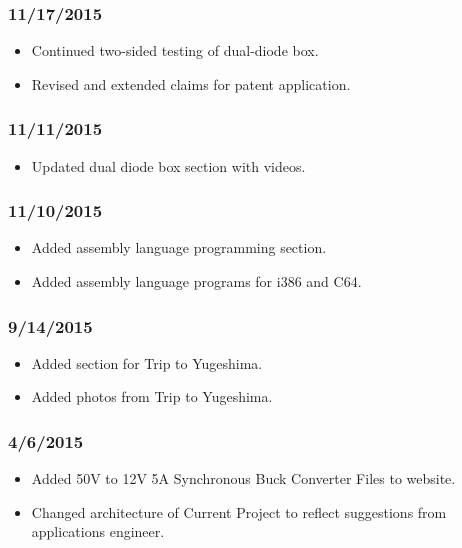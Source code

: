 \subsubsection{11/17/2015}

\begin{itemize}
\item Continued two-sided testing of dual-diode box.
\item Revised and extended claims for patent application.
\end{itemize}

\subsubsection{11/11/2015}

\begin{itemize}
\item Updated dual diode box section with videos.
\end{itemize}

\subsubsection{11/10/2015}

\begin{itemize}
\item Added assembly language programming section.
\item Added assembly language programs for i386 and C64.
\end{itemize}

\subsubsection{9/14/2015}

\begin{itemize}
\item Added section for Trip to Yugeshima.
\item Added photos from Trip to Yugeshima.
\end{itemize}

\subsubsection{4/6/2015}

\begin{itemize}
\item Added 50V to 12V 5A Synchronous Buck Converter Files to website.
\item Changed architecture of Current Project to reflect suggestions from applications engineer.
\end{itemize}

